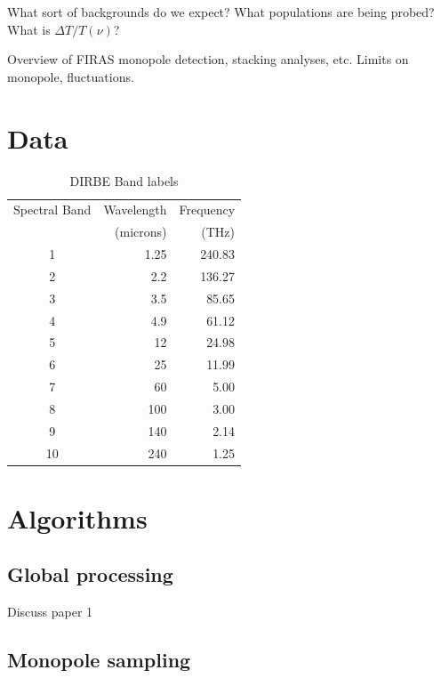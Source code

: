 \documentclass{aa}
\begin{document}
What sort of backgrounds do we expect? What populations are being probed? What is $\Delta T/T(\nu)$?

Overview of FIRAS monopole detection, stacking analyses, etc. Limits on monopole, fluctuations.

\section{Data}

 \begin{table}
\caption{DIRBE Band labels}              %
\label{table:1}      %
\centering                                      %
\begin{tabular}{c r r}          %
\hline\hline                        %
Spectral Band & Wavelength 
	& Frequency \\    %
 & (microns) & (THz) \\
\hline                                   %
	1 & 1.25  & 240.83\\      %
	2 & 2.2   & 136.27\\
	3 & 3.5   & 85.65\\
	4 & 4.9   & 61.12\\
	5 & 12    & 24.98\\
	6 & 25    & 11.99\\
	7 & 60    & 5.00 \\
	8 & 100   & 3.00 \\
	9 & 140   & 2.14 \\
	10 & 240  & 1.25\\
\hline                                             %
\end{tabular}
\end{table}

\section{Algorithms}

\subsection{Global processing}

Discuss paper 1

\subsection{Monopole sampling}
\end{document}
